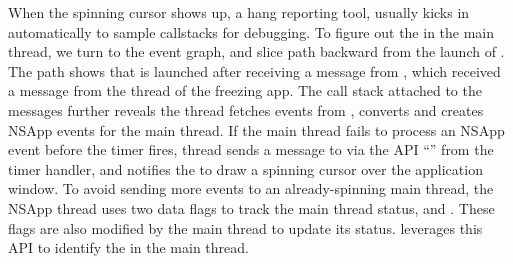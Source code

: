 When the spinning cursor shows up, a hang reporting tool, \spindump usually
kicks in automatically to sample callstacks for debugging. To figure out the
\spinningnode in the main thread, we turn to the event graph, and slice path
backward from the launch of \spindump.
The path shows that \spindump is launched after receiving a message from
, which received a message from the  thread of
the freezing app. The call stack attached to the messages further reveals the
 thread fetches  events from
, converts and creates NSApp events for the main 
thread. If the main thread fails to process an NSApp event before the timer
fires,  thread sends a message to  via the API
``'' from the timer handler, and 
notifies the  to draw a spinning cursor over the application
window. To avoid sending more events to an already-spinning main thread, 
the NSApp thread uses two data flags to track the main thread status, 
 and .
These flags are also modified by the main thread to update its status.
\xxx leverages this API to identify the \spinningnode in the main thread.






